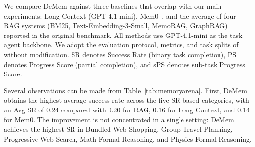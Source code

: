 \documentclass{article}
\theoremstyle{plain}
\theoremstyle{definition}
\theoremstyle{remark}
\begin{document}
We compare DeMem against three baselines that overlap with our main experiments: Long Context (GPT-4.1-mini), Mem0~\citep{chhikara2025mem0buildingproductionreadyai}, and the average of four RAG systems (BM25, Text-Embedding-3-Small, MemoRAG, GraphRAG) reported in the original benchmark. All methods use GPT-4.1-mini as the task agent backbone. We adopt the evaluation protocol, metrics, and task splits of \citet{he2026memoryarenabenchmarkingagentmemory} without modification. SR denotes Success Rate (binary task completion), PS denotes Progress Score (partial completion), and sPS denotes sub-task Progress Score.

\begin{table}[h]
\centering
\caption{Results on MemoryArena. SR = Success Rate, PS = Progress Score, sPS = sub-task Progress Score. Avg SR is computed over the five SR columns: Bundled Web Shopping, Group Travel Planning, Progressive Web Search, Math, and Phys.}
\label{tab:memoryarena}
\end{table}

Several observations can be made from Table~\ref{tab:memoryarena}. First, DeMem obtains the highest average success rate across the five SR-based categories, with an Avg SR of 0.24 compared with 0.20 for RAG, 0.16 for Long Context, and 0.14 for Mem0. The improvement is not concentrated in a single setting: DeMem achieves the highest SR in Bundled Web Shopping, Group Travel Planning, Progressive Web Search, Math Formal Reasoning, and Physics Formal Reasoning.
\end{document}
